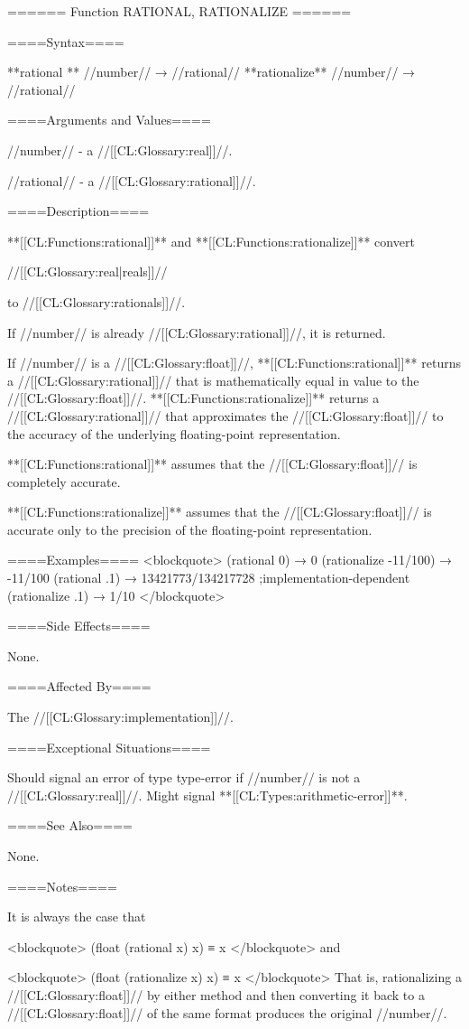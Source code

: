 ====== Function RATIONAL, RATIONALIZE ======

====Syntax====

**rational ** //number// → //rational// **rationalize** //number// → //rational//

====Arguments and Values====

//number// - a //[[CL:Glossary:real]]//.

//rational// - a //[[CL:Glossary:rational]]//.

====Description====

**[[CL:Functions:rational]]** and **[[CL:Functions:rationalize]]** convert

//[[CL:Glossary:real|reals]]//

to //[[CL:Glossary:rationals]]//.

If //number// is already //[[CL:Glossary:rational]]//, it is returned.

If //number// is a //[[CL:Glossary:float]]//, **[[CL:Functions:rational]]** returns a //[[CL:Glossary:rational]]// that is mathematically equal in value to the //[[CL:Glossary:float]]//. **[[CL:Functions:rationalize]]** returns a //[[CL:Glossary:rational]]// that approximates the //[[CL:Glossary:float]]// to the accuracy of the underlying floating-point representation.

**[[CL:Functions:rational]]** assumes that the //[[CL:Glossary:float]]// is completely accurate.

**[[CL:Functions:rationalize]]** assumes that the //[[CL:Glossary:float]]// is accurate only to the precision of the floating-point representation.

====Examples==== <blockquote> (rational 0) → 0 (rationalize -11/100) → -11/100 (rational .1) → 13421773/134217728 ;implementation-dependent (rationalize .1) → 1/10 </blockquote>

====Side Effects====

None.

====Affected By====

The //[[CL:Glossary:implementation]]//.

====Exceptional Situations====

Should signal an error of type type-error if //number// is not a //[[CL:Glossary:real]]//. Might signal **[[CL:Types:arithmetic-error]]**.

====See Also====

None.

====Notes====

It is always the case that

<blockquote> (float (rational x) x) ≡ x </blockquote> and

<blockquote> (float (rationalize x) x) ≡ x </blockquote> That is, rationalizing a //[[CL:Glossary:float]]// by either method and then converting it back to a //[[CL:Glossary:float]]// of the same format produces the original //number//.

